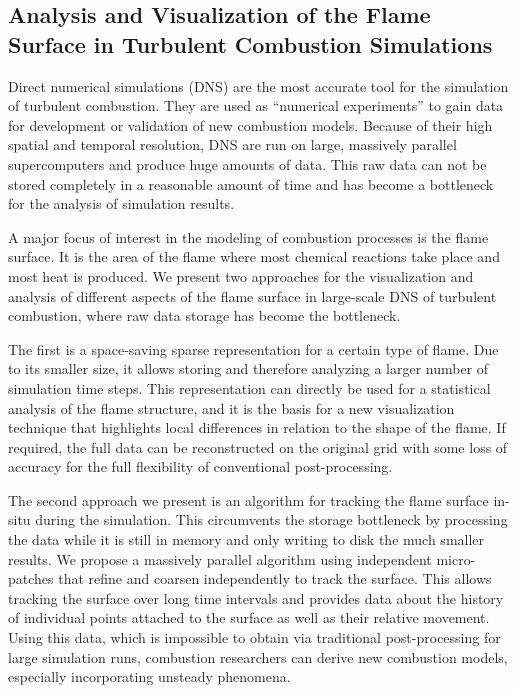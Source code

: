 \subsection{Analysis and Visualization of the Flame Surface in Turbulent
Combustion Simulations} %
\label{sub:contr_flame_vis}
%
Direct numerical simulations (\acs{DNS}) are the most accurate tool
for the simulation of turbulent combustion.
%
They are used as ``numerical experiments'' to gain data for development or
validation of new combustion models.
%
Because of their high spatial and temporal resolution, \ac{DNS} are run on
large, massively parallel supercomputers and produce huge amounts of data.
%
This raw data can not be stored completely in a reasonable amount of time and
has become a bottleneck for the analysis of simulation results.
%

%
A major focus of interest in the modeling of combustion processes is the flame
surface.
%
It is the area of the flame where most chemical reactions take place and most
heat is produced.
%
We present two approaches for the visualization and analysis of different
aspects of the flame surface in large-scale \ac{DNS} of turbulent combustion,
where raw data storage has become the bottleneck.
%

%
The first is a space-saving sparse representation for a certain type of flame.
%
Due to its smaller size, it allows storing and therefore analyzing a larger
number of simulation time steps.
%
This representation can directly be used for a statistical analysis of the flame
structure, and it is the basis for a new visualization technique that highlights
local differences in relation to the shape of the flame.
%
If required, the full data can be reconstructed on the original grid with some
loss of accuracy for the full flexibility of conventional post-processing.
%

%
The second approach we present is an algorithm for tracking the flame surface
in-situ during the simulation.
%
This circumvents the storage bottleneck by processing the data while it is still
in memory and only writing to disk the much smaller results.
%
We propose a massively parallel algorithm using independent micro-patches that
refine and coarsen independently to track the surface.
%
This allows tracking the surface over long time intervals and provides data
about the history of individual points attached to the surface as well as their
relative movement.
%
Using this data, which is impossible to obtain via traditional post-processing
for large simulation runs, combustion researchers can derive new combustion
models, especially incorporating unsteady phenomena.
%
%
